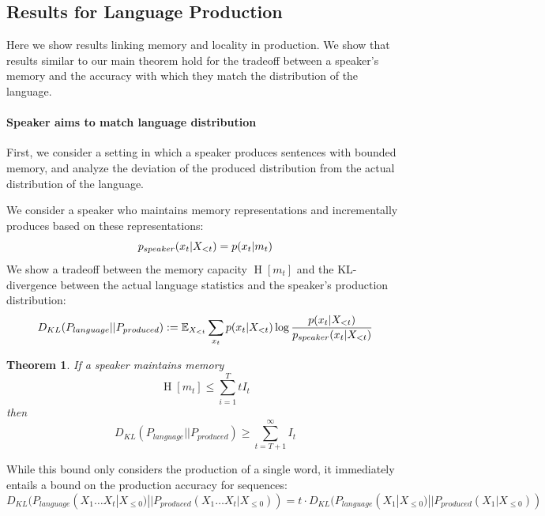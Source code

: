 \documentclass[11pt,letterpaper]{article}
\newcommand{\E}[0]{\mathbb{E}}
\newcounter{theorem}
\newtheorem{thm}[theorem]{Theorem}
\begin{document}
\subsection{Results for Language Production}

Here we show results linking memory and locality in production.
We show that results similar to our main theorem hold for the tradeoff between a speaker's memory and the accuracy with which they match the distribution of the language.



\paragraph{Speaker aims to match language distribution}
First, we consider a setting in which a speaker produces sentences with bounded memory, and analyze the deviation of the produced distribution from the actual distribution of the language.

We consider a speaker who maintains memory representations and incrementally produces based on these representations:
\begin{equation}
	p_{speaker}(x_t|X_{<t}) = p(x_t|m_t) \\
\end{equation}
We show a tradeoff between the memory capacity $\operatorname{H}[m_t]$ and the KL-divergence between the actual language statistics and the speaker's production distribution:
\begin{equation}
D_{KL}(P_{language}||P_{produced})  := \E_{X_{<t}} \sum_{x_t} p(x_t|X_{<t}) \log \frac{p(x_t|X_{<t})}{p_{speaker}(x_t|X_{<t})} \\
\end{equation}
\begin{thm}
If a speaker maintains memory
	\begin{equation}
		\operatorname{H}[m_t] \leq \sum_{i=1}^T tI_t
	\end{equation}
	then 
\begin{equation}
	D_{KL}(P_{language}||P_{produced}) \geq \sum_{t=T+1}^\infty I_t
\end{equation}
\end{thm}

While this bound only considers the production of a single word, it immediately entails a bound on the production accuracy for sequences:
\begin{equation}
	D_{KL}(P_{language}(X_1\dots X_t|X_{\leq 0})||P_{produced}(X_1\dots X_t|X_{\leq 0}))  = t \cdot D_{KL}(P_{language}(X_1|X_{\leq 0})||P_{produced}(X_1|X_{\leq 0}))
\end{equation}
\end{document}
